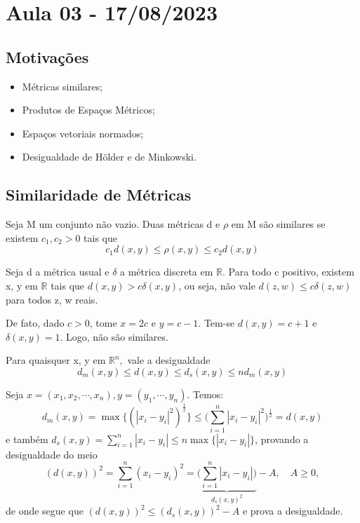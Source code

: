 \documentclass[metric_notes.tex]{subfiles}
\begin{document}
\section{Aula 03 - 17/08/2023}
\subsection{Motivações}
\begin{itemize}
	\item Métricas similares;
	\item Produtos de Espaços Métricos;
	\item Espaços vetoriais normados;
	\item Desigualdade de Hölder e de Minkowski.
\end{itemize}
\subsection{Similaridade de Métricas}
\begin{def*}
	Seja M um conjunto não vazio. Duas métricas d e \(\rho \) em M são similares se existem \(c_{1}, c_{2} > 0\) tais que
	\[
		c_{1}d(x, y)\leq \rho (x, y)\leq c_{2}d(x, y)
	\]
\end{def*}
\begin{example}
	Seja d a métrica usual e \(\delta  \) a métrica discreta em \(\mathbb{R}\). Para todo c positivo, existem
	x, y em \(\mathbb{R}\) tais que \(d(x, y) > c\delta (x, y)\), ou seja, não vale \(d(z, w)\leq c\delta (z, w)\) para todos
	z, w reais.

	De fato, dado \(c > 0\), tome \(x=2c\) e \(y=c-1.\) Tem-se \(d(x, y) = c + 1\) e \(\delta (x, y) = 1\). Logo, não são similares.
\end{example}
\begin{prop*}
	Para quaisquer x, y em \(\mathbb{R}^{n},\) vale a desigualdade
	\[
		d_{m}(x,y)\leq d(x,y)\leq d_{s}(x, y)\leq nd_{m}(x,y)
	\]
\end{prop*}
\begin{proof*}
	Seja \(x=(x_{1}, x_{2}, \cdots, x_{n}), y = (y_{1}, \cdots, y_{n})\). Temos:
	\[
		d_{m}(x, y) = \max \biggl\{(|x_{i}-y_{i}|^{2})^{\frac{1}{2}}\biggr\}\leq \biggl(\sum\limits_{i=1}^{n}|x_{i}-y_{i}|^{2}\biggr)^{\frac{1}{2}} = d(x, y)
	\]
	e também \(d_{s}(x, y) = \sum\limits_{i=1}^{n}|x_{i}-y_{i}|\leq n\max \biggl\{|x_{i}-y_{i}|\biggr\}\),
	provando a desigualdade do meio
	\[
		(d(x,y))^{2} = \sum\limits_{i=1}^{n}(x_{i}-y_{i})^{2} = \underbrace{\biggl(\sum\limits_{i=1}^{n}|x_{i}-y_{i}|\biggr)}_{d_{s}(x, y)^{2}} - A,\quad A\geq 0,
	\]
	de onde segue que \((d(x, y))^{2}\leq (d_{s}(x, y))^{2} - A\) e prova a desigualdade. \qedsymbol
\end{proof*}
\end{document}
